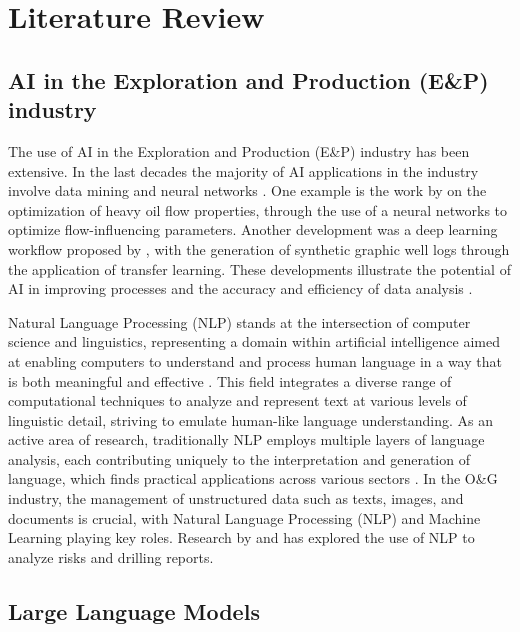    
\chapter{Literature Review} 

    \section{AI in the Exploration and Production (E\&P) industry}

        The use of AI in the Exploration and Production (E\&P) industry has been extensive. In the last decades the majority of AI applications in the industry involve data mining and neural networks \cite{Bravo2014}. One example is the work by \cite{Gudala2021} on the optimization of heavy oil flow properties, through the use of a neural networks to optimize flow-influencing parameters.
        Another development was a deep learning workflow proposed by \cite{Gohari2024}, with the generation of synthetic graphic well logs through the application of transfer learning. These developments illustrate the potential of AI in improving processes and the accuracy and efficiency of data analysis \cite{Rahmani2021}.
    
        Natural Language Processing (NLP) stands at the intersection of computer science and linguistics, representing a domain within artificial intelligence aimed at enabling computers to understand and process human language in a way that is both meaningful and effective \cite{Liddy2001}. This field integrates a diverse range of computational techniques to analyze and represent text at various levels of linguistic detail, striving to emulate human-like language understanding. As an active area of research, traditionally NLP  employs multiple layers of language analysis, each contributing uniquely to the interpretation and generation of language, which finds practical applications across various sectors \cite{Liddy2001}.      
        In the O\&G industry, the management of unstructured data such as texts, images, and documents is crucial, with Natural Language Processing (NLP) and Machine Learning playing key roles.
        Research by \cite{Antoniak2016} and \cite{Castineira2018} has explored the use of NLP to analyze risks and drilling reports.           
    
    \section{Large Language Models}         

